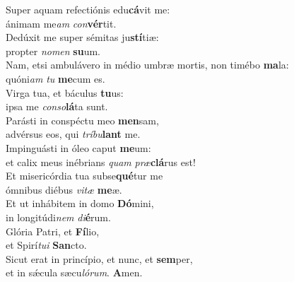 \evenverse Super aquam refectiónis edu\textbf{cá}vit me:~\*\\
\evenverse ánimam me\textit{am} \textit{con}\textbf{vér}tit.\\
\oddverse Dedúxit me super sémitas ju\textbf{stí}tiæ:~\*\\
\oddverse propter \textit{no}\textit{men} \textbf{su}um.\\
\evenverse Nam, etsi ambulávero in médio umbræ mortis, non timébo \textbf{ma}la:~\*\\
\evenverse quóni\textit{am} \textit{tu} \textbf{me}cum es.\\
\oddverse Virga tua, et báculus \textbf{tu}us:~\*\\
\oddverse ipsa me \textit{con}\textit{so}\textbf{lá}ta sunt.\\
\evenverse Parásti in conspéctu meo \textbf{men}sam,~\*\\
\evenverse advérsus eos, qui \textit{trí}\textit{bu}\textbf{lant} me.\\
\oddverse Impinguásti in óleo caput \textbf{me}um:~\*\\
\oddverse et calix meus inébrians \textit{quam} \textit{præ}\textbf{clá}rus est!\\
\evenverse Et misericórdia tua subse\textbf{qué}tur me~\*\\
\evenverse ómnibus diébus \textit{vi}\textit{tæ} \textbf{me}æ.\\
\oddverse Et ut inhábitem in domo \textbf{Dó}mini,~\*\\
\oddverse in longitúdi\textit{nem} \textit{di}\textbf{é}rum.\\
\evenverse Glória Patri, et \textbf{Fí}lio,~\*\\
\evenverse et Spirí\textit{tu}\textit{i} \textbf{San}cto.\\
\oddverse Sicut erat in princípio, et nunc, et \textbf{sem}per,~\*\\
\oddverse et in sǽcula sæcu\textit{ló}\textit{rum}. \textbf{A}men.\\
